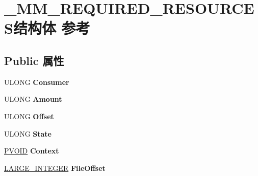 \hypertarget{struct___m_m___r_e_q_u_i_r_e_d___r_e_s_o_u_r_c_e_s}{}\section{\+\_\+\+M\+M\+\_\+\+R\+E\+Q\+U\+I\+R\+E\+D\+\_\+\+R\+E\+S\+O\+U\+R\+C\+E\+S结构体 参考}
\label{struct___m_m___r_e_q_u_i_r_e_d___r_e_s_o_u_r_c_e_s}
\subsection*{Public 属性}
\begin{DoxyCompactItemize}
\item 
\mbox{\label{struct___m_m___r_e_q_u_i_r_e_d___r_e_s_o_u_r_c_e_s_a49c7614be93d469efb2fccaf40205eec}} 
U\+L\+O\+NG {\bfseries Consumer}
\item 
\mbox{\label{struct___m_m___r_e_q_u_i_r_e_d___r_e_s_o_u_r_c_e_s_ad78d4c1f5cdbac86ac0cce8ba1b98d21}} 
U\+L\+O\+NG {\bfseries Amount}
\item 
\mbox{\label{struct___m_m___r_e_q_u_i_r_e_d___r_e_s_o_u_r_c_e_s_afc591c3b3a58aa23544abaad5b07ad7d}} 
U\+L\+O\+NG {\bfseries Offset}
\item 
\mbox{\label{struct___m_m___r_e_q_u_i_r_e_d___r_e_s_o_u_r_c_e_s_aabef5136fe136e3c576a1753b2965a1f}} 
U\+L\+O\+NG {\bfseries State}
\item 
\mbox{\label{struct___m_m___r_e_q_u_i_r_e_d___r_e_s_o_u_r_c_e_s_a062926a3c3be0c03d5feb0ef420c4cee}} 
\hyperlink{interfacevoid}{P\+V\+O\+ID} {\bfseries Context}
\item 
\mbox{\label{struct___m_m___r_e_q_u_i_r_e_d___r_e_s_o_u_r_c_e_s_a376fdf6851f7c3c989ba5f7ae3a578e0}} 
\hyperlink{union___l_a_r_g_e___i_n_t_e_g_e_r}{L\+A\+R\+G\+E\+\_\+\+I\+N\+T\+E\+G\+ER} {\bfseries File\+Offset}
\item 

\end{DoxyCompactItemize}
